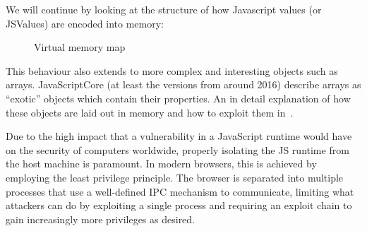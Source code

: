 \documentclass{article}
\begin{document}
We will continue by looking at the structure of how Javascript values (or JSValues) are encoded into memory:

\begin{figure}[H]%
  \centering
  \caption{\label{fig:label} Virtual memory map}%
  \label{fig:stackframe}
\end{figure}
This behaviour also extends to more complex and interesting objects such as arrays. JavaScriptCore (at least the versions from around 2016) describe arrays as ``exotic'' objects which contain their properties. An in detail explanation of how these objects are laid out in memory and how to exploit them in~\cite{saelo2016}.


Due to the high impact that a vulnerability in a JavaScript runtime would have on the security of computers worldwide, properly isolating the JS runtime from the host machine is paramount. In modern browsers, this is achieved by employing the least privilege principle. The browser is separated into multiple processes that use a well-defined IPC mechanism to communicate, limiting what attackers can do by exploiting a single process and requiring an exploit chain to gain increasingly more privileges as desired.
\end{document}
